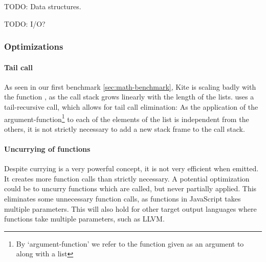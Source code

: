 TODO: Data structures.

TODO: I/O?

\subsubsection{Optimizations}
\label{sec:disc-optimization}

\paragraph{Tail call}
As seen in our first benchmark \ref{sec:math-benchmark}, Kite is scaling badly with the function , as the call stack grows linearly with the length of the lists.  uses a tail-recursive call, which allows for tail call elimination: As the application of the argument-function\footnote{By `argument-function' we refer to the function given as an argument to  along with a list} to each of the elements of the list is independent from the others, it is not strictly necessary to add a new stack frame to the call stack.

\paragraph{Uncurrying of functions}
Despite currying is a very powerful concept, it is not very efficient when emitted. It creates more function calls than strictly necessary. A potential optimization could be to uncurry functions which are called, but never partially applied. This eliminates some unnecessary function calls, as functions in JavaScript takes multiple parameters. This will also hold for other target output languages where functions take multiple parameters, such as LLVM.
